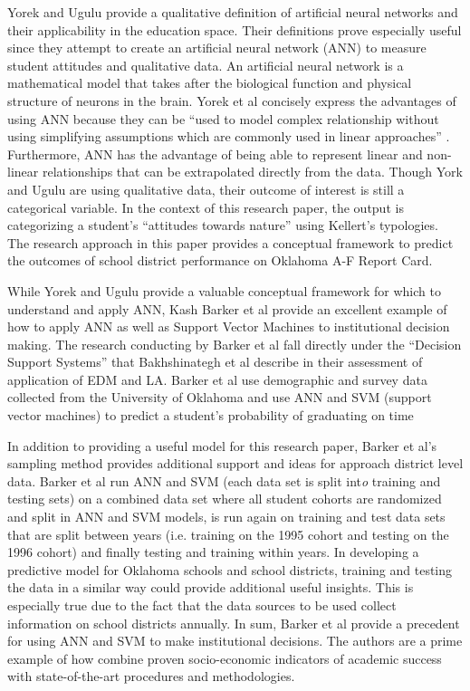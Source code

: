 \documentclass[12pt,a4paper]{article}
\begin{document}
Yorek and Ugulu provide a qualitative definition of artificial neural networks and their applicability in the education space. Their definitions prove especially useful since they attempt to create an artificial neural network (ANN) to measure student attitudes and qualitative data. An artificial neural network is a mathematical model that takes after the biological function and physical structure of neurons in the brain. Yorek et al concisely express the advantages of using ANN because they can be “used to model complex relationship without using simplifying assumptions which are commonly used in linear approaches” \cite{yorek}. Furthermore, ANN has the advantage of being able to represent linear and non-linear relationships that can be extrapolated directly from the data. Though York and Ugulu are using qualitative data, their outcome of interest is still a categorical variable. In the context of this research paper, the output is categorizing a student’s “attitudes towards nature” using Kellert’s typologies. The research approach in this paper provides a conceptual framework to predict the outcomes of school district performance on Oklahoma A-F Report Card. 

While Yorek and Ugulu provide a valuable conceptual framework for which to understand and apply ANN, Kash Barker et al provide an excellent example of how to apply ANN as well as Support Vector Machines to institutional decision making. The research conducting by Barker et al fall directly under the “Decision Support Systems” that Bakhshinategh et al describe in their assessment of application of EDM and LA. Barker et al use demographic and survey data collected from the University of Oklahoma and use ANN and SVM (support vector machines) to predict a student’s probability of graduating on time \cite{1314666}

In addition to providing a useful model for this research paper, Barker et al’s sampling method provides additional support and ideas for approach district level data. Barker et al run ANN and SVM (each data set is split int\textsl{o} training and testing sets) on a combined data set where all student cohorts are randomized and split in ANN and SVM models, is run again on training and test data sets that are split between years (i.e. training on the 1995 cohort and testing on the 1996 cohort) and finally testing and training within years. In developing a predictive model for Oklahoma schools and school districts, training and testing the data in a similar way could provide additional useful insights. This is especially true due to the fact that the data sources to be used collect information on school districts annually. In sum, Barker et al provide a precedent for using ANN and SVM to make institutional decisions. The authors are a prime example of how combine proven socio-economic indicators of academic success with state-of-the-art procedures and methodologies\cite{1314666}.   
\end{document}
